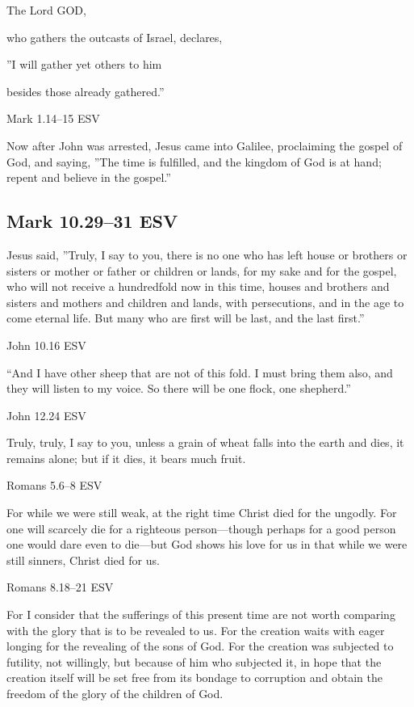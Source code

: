\documentclass[
]{article}
\newcommand{\RL}[1]{\beginR #1\endR}
\begin{document}
The Lord GOD,

who gathers the outcasts of Israel, declares,

\RL{''}I will gather yet others to him

besides those already gathered.''

Mark 1.14--15 ESV

Now after John was arrested, Jesus came into Galilee, proclaiming the
gospel of God, and saying, \RL{''}The time is fulfilled, and the kingdom
of God is at hand; repent and believe in the gospel.''

\subsection{Mark 10.29--31 ESV}\label{mark-10.2931-esv}

Jesus said, \RL{''}Truly, I say to you, there is no one who has left
house or brothers or sisters or mother or father or children or lands,
for my sake and for the gospel, who will not receive a hundredfold now
in this time, houses and brothers and sisters and mothers and children
and lands, with persecutions, and in the age to come eternal life. But
many who are first will be last, and the last first.''

John 10.16 ESV

``And I have other sheep that are not of this fold. I must bring them
also, and they will listen to my voice. So there will be one flock, one
shepherd.''

John 12.24 ESV

Truly, truly, I say to you, unless a grain of wheat falls into the earth
and dies, it remains alone; but if it dies, it bears much fruit.

Romans 5.6--8 ESV

For while we were still weak, at the right time Christ died for the
ungodly. For one will scarcely die for a righteous person---though
perhaps for a good person one would dare even to die---but God shows his
love for us in that while we were still sinners, Christ died for us.

Romans 8.18--21 ESV

For I consider that the sufferings of this present time are not worth
comparing with the glory that is to be revealed to us. For the creation
waits with eager longing for the revealing of the sons of God. For the
creation was subjected to futility, not willingly, but because of him
who subjected it, in hope that the creation itself will be set free from
its bondage to corruption and obtain the freedom of the glory of the
children of God.
\end{document}
